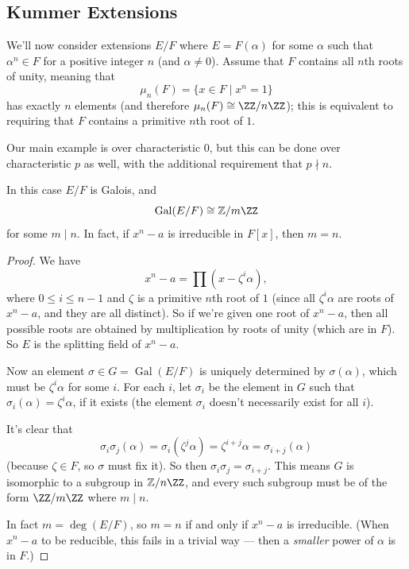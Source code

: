 \subsection{Kummer Extensions}

We'll now consider extensions $E/F$ where $E = F(\alpha)$ for some $\alpha$ such that $\alpha^n \in F$ for a positive integer $n$ (and $\alpha \neq 0$). Assume that $F$ contains all $n$th roots of unity, meaning that \[\mu_n(F) = \{x \in F \mid x^n = 1\}\] has exactly $n$ elements (and therefore $\mu_n(F) \cong \ZZ/n\ZZ$); this is equivalent to requiring that $F$ contains a primitive $n$th root of $1$. 

Our main example is over characteristic $0$, but this can be done over characteristic $p$ as well, with the additional requirement that $p \nmid n$. 

\begin{proposition}
    In this case $E/F$ is Galois, and \[\operatorname{Gal}(E/F) \cong \mathbb{Z}/m\ZZ\] for some $m \mid n$. In fact, if $x^n - a$ is irreducible in $F[x]$, then $m = n$. 
\end{proposition}

\begin{proof}
    We have \[x^n - a = \prod (x - \zeta^i\alpha),\] where $0 \leq i \leq n - 1$ and $\zeta$ is a primitive $n$th root of $1$ (since all $\zeta^i\alpha$ are roots of $x^n - a$, and they are all distinct). So if we're given one root of $x^n - a$, then all possible roots are obtained by multiplication by roots of unity (which are in $F$). So $E$ is the splitting field of $x^n - a$. 
    
    Now an element $\sigma \in G = \operatorname{Gal}(E/F)$ is uniquely determined by $\sigma(\alpha)$, which must be $\zeta^i\alpha$ for some $i$. For each $i$, let $\sigma_i$ be the element in $G$ such that $\sigma_i(\alpha) = \zeta^i\alpha$, if it exists (the element $\sigma_i$ doesn't necessarily exist for all $i$). 

    It's clear that \[\sigma_i\sigma_j(\alpha) = \sigma_i(\zeta^j\alpha) = \zeta^{i + j}\alpha = \sigma_{i + j}(\alpha)\] (because $\zeta \in F$, so $\sigma$ must fix it). So then $\sigma_i\sigma_j = \sigma_{i + j}$. This means $G$ is isomorphic to a subgroup in $\mathbb{Z}/n\ZZ$, and every such subgroup must be of the form $\ZZ/m\ZZ$ where $m \mid n$.  

    In fact $m = \deg(E/F)$, so $m = n$ if and only if $x^n - a$ is irreducible. (When $x^n - a$ to be reducible, this fails in a trivial way --- then a \emph{smaller} power of $\alpha$ is in $F$.)
\end{proof}

